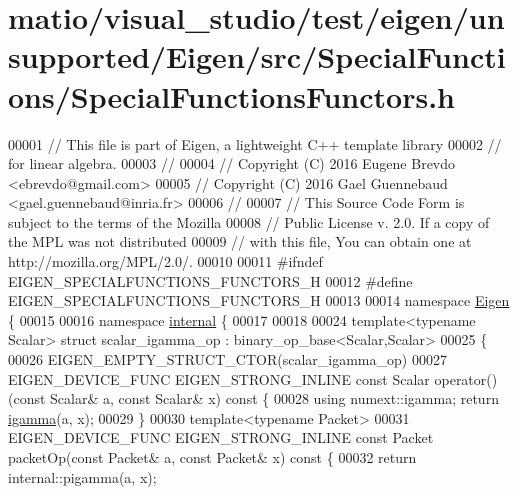 \hypertarget{matio_2visual__studio_2test_2eigen_2unsupported_2_eigen_2src_2_special_functions_2_special_functions_functors_8h_source}{}\section{matio/visual\+\_\+studio/test/eigen/unsupported/\+Eigen/src/\+Special\+Functions/\+Special\+Functions\+Functors.h}
\label{matio_2visual__studio_2test_2eigen_2unsupported_2_eigen_2src_2_special_functions_2_special_functions_functors_8h_source}

\begin{DoxyCode}
00001 \textcolor{comment}{// This file is part of Eigen, a lightweight C++ template library}
00002 \textcolor{comment}{// for linear algebra.}
00003 \textcolor{comment}{//}
00004 \textcolor{comment}{// Copyright (C) 2016 Eugene Brevdo <ebrevdo@gmail.com>}
00005 \textcolor{comment}{// Copyright (C) 2016 Gael Guennebaud <gael.guennebaud@inria.fr>}
00006 \textcolor{comment}{//}
00007 \textcolor{comment}{// This Source Code Form is subject to the terms of the Mozilla}
00008 \textcolor{comment}{// Public License v. 2.0. If a copy of the MPL was not distributed}
00009 \textcolor{comment}{// with this file, You can obtain one at http://mozilla.org/MPL/2.0/.}
00010 
00011 \textcolor{preprocessor}{#ifndef EIGEN\_SPECIALFUNCTIONS\_FUNCTORS\_H}
00012 \textcolor{preprocessor}{#define EIGEN\_SPECIALFUNCTIONS\_FUNCTORS\_H}
00013 
00014 \textcolor{keyword}{namespace }\hyperlink{namespace_eigen}{Eigen} \{
00015 
00016 \textcolor{keyword}{namespace }\hyperlink{namespaceinternal}{internal} \{
00017 
00018 
00024 \textcolor{keyword}{template}<\textcolor{keyword}{typename} Scalar> \textcolor{keyword}{struct }scalar\_igamma\_op : binary\_op\_base<Scalar,Scalar>
00025 \{
00026   EIGEN\_EMPTY\_STRUCT\_CTOR(scalar\_igamma\_op)
00027   EIGEN\_DEVICE\_FUNC EIGEN\_STRONG\_INLINE \textcolor{keyword}{const} Scalar operator() (\textcolor{keyword}{const} Scalar& a, \textcolor{keyword}{const} Scalar& x)\textcolor{keyword}{ const }\{
00028     \textcolor{keyword}{using} numext::igamma; \textcolor{keywordflow}{return} \hyperlink{namespace_eigen_af5aa651137636b1cdbd27de1cfe91148}{igamma}(a, x);
00029   \}
00030   \textcolor{keyword}{template}<\textcolor{keyword}{typename} Packet>
00031   EIGEN\_DEVICE\_FUNC EIGEN\_STRONG\_INLINE \textcolor{keyword}{const} Packet packetOp(\textcolor{keyword}{const} Packet& a, \textcolor{keyword}{const} Packet& x)\textcolor{keyword}{ const }\{
00032     \textcolor{keywordflow}{return} internal::pigamma(a, x);

\end{DoxyCode}

